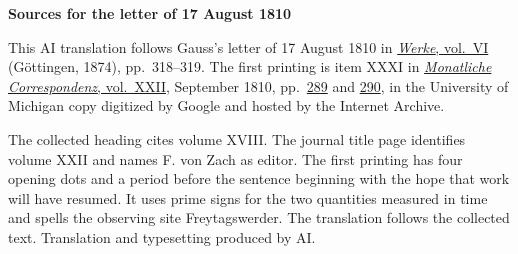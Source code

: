 \clearpage\thispagestyle{empty}
\begin{center}\textbf{Sources for the letter of 17 August 1810}\end{center}
\noindent This AI translation follows Gauss’s letter of 17 August 1810 in \href{https://gdz.sub.uni-goettingen.de/id/PPN236007467}{\textit{Werke}, vol.~VI} (Göttingen, 1874), pp.~318--319. The first printing is item XXXI in \href{https://archive.org/download/bub_gb_YCI4AAAAMAAJ/page/n4.jpg}{\textit{Monatliche Correspondenz}, vol.~XXII}, September 1810, pp.~\href{https://archive.org/download/bub_gb_YCI4AAAAMAAJ/page/n292.jpg}{289} and \href{https://archive.org/download/bub_gb_YCI4AAAAMAAJ/page/n293.jpg}{290}, in the University of Michigan copy digitized by Google and hosted by the Internet Archive.
\par\smallskip\noindent The collected heading cites volume XVIII. The journal title page identifies volume XXII and names F. von Zach as editor. The first printing has four opening dots and a period before the sentence beginning with the hope that work will have resumed. It uses prime signs for the two quantities measured in time and spells the observing site Freytagswerder. The translation follows the collected text. Translation and typesetting produced by AI.
\clearpage
